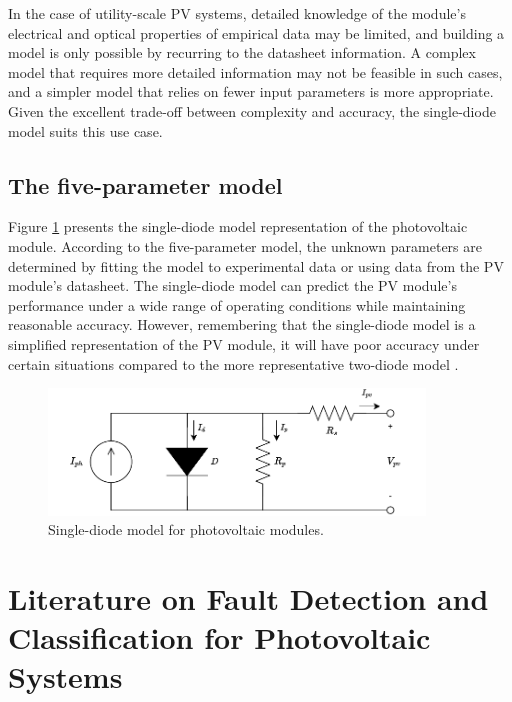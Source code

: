 In the case of utility-scale PV systems, detailed knowledge of the module's electrical and optical properties of empirical data may be limited, and building a model is only possible by recurring to the datasheet information. A complex model that requires more detailed information may not be feasible in such cases, and a simpler model that relies on fewer input parameters is more appropriate. Given the excellent trade-off between complexity and accuracy, the single-diode model suits this use case.

\subsection{The five-parameter model}

Figure \ref{fig:onediodedraw} presents the single-diode model representation of the photovoltaic module. According to the five-parameter model, the unknown parameters are determined by fitting the model to experimental data or using data from the PV module's datasheet. The single-diode model can predict the PV module's performance under a wide range of operating conditions while maintaining reasonable accuracy. However, remembering that the single-diode model is a simplified representation of the PV module, it will have poor accuracy under certain situations compared to the more representative two-diode model \cite{Godina2017}.

\begin{figure}[H]
    \centering
    \includegraphics[width=10cm]{figures/chapter2/onediode.drawio.pdf} \caption{Single-diode model for photovoltaic modules.}
    \label{fig:onediodedraw}
\end{figure}


\section{Literature on Fault Detection and Classification for Photovoltaic Systems}

